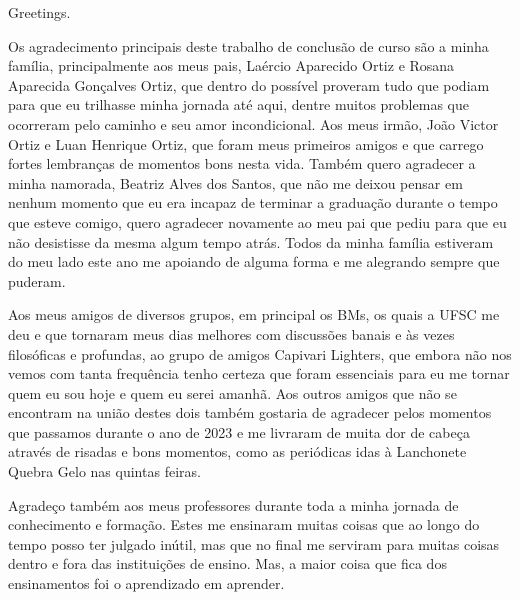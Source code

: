 


\begin{agradecimentos}

\lang
{
    Greetings.
}
{
    Os agradecimento principais deste trabalho de conclusão de curso são a minha
    família, principalmente aos meus pais, Laércio Aparecido Ortiz e Rosana
    Aparecida Gonçalves Ortiz, que dentro do possível proveram tudo que podiam
    para que eu trilhasse minha jornada até aqui, dentre muitos problemas que
    ocorreram pelo caminho e seu amor incondicional. Aos meus irmão, João Victor
    Ortiz e Luan Henrique Ortiz, que foram meus primeiros amigos e que carrego
    fortes lembranças de momentos bons nesta vida. Também quero agradecer a minha
    namorada, Beatriz Alves dos Santos, que não me deixou pensar em nenhum momento
    que eu era incapaz de terminar a graduação durante o tempo que esteve comigo,
    quero agradecer novamente ao meu pai que pediu para que eu não desistisse da
    mesma algum tempo atrás. Todos da minha família estiveram do meu lado este ano
    me apoiando de alguma forma e me alegrando sempre que puderam.

	Aos meus amigos de diversos grupos, em principal os BMs, os quais a UFSC me deu
	e que tornaram meus dias melhores com discussões banais e às vezes filosóficas e
	profundas, ao grupo de amigos Capivari Lighters, que embora não nos vemos com
	tanta frequência tenho certeza que foram essenciais para eu me tornar quem eu sou
	hoje e quem eu serei amanhã. Aos outros amigos que não se encontram na união destes
	dois também gostaria de agradecer pelos momentos que passamos durante o ano de
	2023 e me livraram de muita dor de cabeça através de risadas e bons momentos, como
	as periódicas idas à Lanchonete Quebra Gelo nas quintas feiras.
	
	Agradeço também aos meus professores durante toda a minha jornada de conhecimento 
	e formação. Estes me ensinaram muitas coisas que ao longo do tempo posso ter julgado
	inútil, mas que no final me serviram para muitas coisas dentro e fora das instituições
	de ensino. Mas, a maior coisa que fica dos ensinamentos foi o aprendizado em aprender.
}
\end{agradecimentos}


%
%
%
